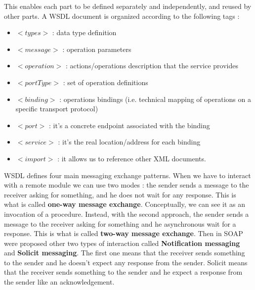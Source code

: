 This enables each part to be defined separately and independently, and reused by other parts. A WSDL document is organized according to the following tags :
\begin{itemize}
    \item $<types>$ : data type definition
    \item $<message>$ : operation parameters
    \item $<operation>$ : actions/operations description that the service provides
    \item $<portType>$ : set of operation definitions
    \item $<binding>$ : operations bindings (i.e. technical mapping of operations on a specific transport protocol)
    \item $<port>$ : it's a concrete endpoint associated with the binding
    \item $<service>$ : it's the real location/address for each binding
    \item $<import>$ : it allows us to reference other XML documents.
\end{itemize}
WSDL defines four main messaging exchange patterns. When we have to interact with a remote module we can use two modes : the sender sends a message to the receiver asking for something, and he does not wait for any response. This is what is called \textbf{one-way message exchange}. Conceptually, we can see it as an invocation of a procedure. Instead, with the second approach, the sender sends a message to the receiver asking for something and he asynchronous wait for a response. This is what is called \textbf{two-way message exchange}. Then in SOAP were proposed other two types of interaction called \textbf{Notification messaging} and \textbf{Solicit messaging}. The first one means that the receiver sends something to the sender and he doesn't expect any response from the sender. Solicit means that the receiver sends something to the sender and he expect a response from the sender like an acknowledgement.

